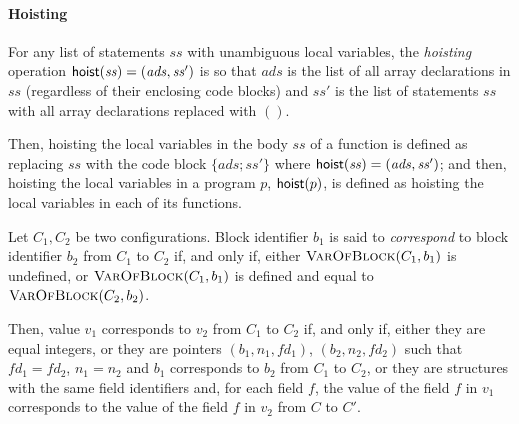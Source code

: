 \paragraph{Hoisting}

\begin{definition}[Hoisting]
  For any list of statements $\mathit{ss}$ with unambiguous local
  variables, the \emph{hoisting} operation $\text{\textsf{hoist}}(\mathit{ss}) =
  (\mathit{ads}, \mathit{ss}')$ is so that $\mathit{ads}$ is the list
  of all array declarations in $\mathit{ss}$ (regardless of their
  enclosing code blocks) and $\mathit{ss}'$ is the list of statements
  $\mathit{ss}$ with all array declarations replaced with $()$.

  Then, hoisting the local variables in the body $ss$ of a function is
  defined as replacing $ss$ with the code block $\{ \mathit{ads};
  \mathit{ss}' \} $ where $\text{\textsf{hoist}}(\mathit{ss}) = (\mathit{ads},
  \mathit{ss}')$; and then, hoisting the local variables in a program
  $p$, $\text{\textsf{hoist}}(p)$, is defined as hoisting the local variables in
  each of its functions.
\end{definition}

\begin{definition} \label{def:cstar-3-rename-blocks}
  Let $C_1, C_2$ be two  configurations. Block identifier $b_1$ is
  said to \emph{correspond} to block identifier $b_2$ from $C_1$ to
  $C_2$ if, and only if, either $\textsc{VarOfBlock}(C_1, b_1)$ is
  undefined, or $\textsc{VarOfBlock}(C_1, b_1)$ is defined and equal
  to $\textsc{VarOfBlock}(C_2, b_2)$.

  Then, value $v_1$ corresponds to $v_2$ from $C_1$ to $C_2$ if, and
  only if, either they are equal integers, or they are pointers $(b_1,
  n_1, fd_1)$, $(b_2, n_2, fd_2)$ such that $fd_1 = fd_2$, $n_1 = n_2$
  and $b_1$ corresponds to $b_2$ from $C_1$ to $C_2$, or they are
  structures with the same field identifiers and, for each field $f$,
  the value of the field $f$ in $v_1$ corresponds to the value of the
  field $f$ in $v_2$ from $C$ to $C'$.
\end{definition}

